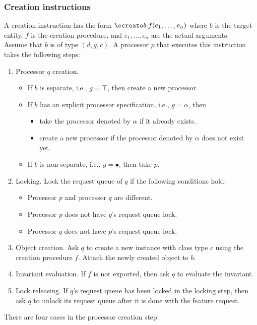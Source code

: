 \subsubsection{Creation instructions}
A creation instruction has the form $\ecreate b.f(e_{1}, \ldots, e_{n})$ where $b$ is the target entity, $f$ is the creation procedure, and $e_{1}, \ldots, e_{n}$ are the actual arguments. Assume that $b$ is of type $(d, g, c)$. A processor $p$ that executes this instruction takes the following steps:
\begin{enumerate}
	\item Processor $q$ creation.
		\begin{itemize}
			\item If $b$ is separate, i.e., $g = \top$, then create a new processor.
			\item If $b$ has an explicit processor specification, i.e., $g = \alpha$, then
				\begin{itemize}
					\item take the processor denoted by $\alpha$ if it already exists.
					\item create a new processor if the processor denoted by $\alpha$ does not exist yet.
				\end{itemize}
			\item If $b$ is non-separate, i.e., $g = \bullet$, then take $p$.
		\end{itemize}
	\item Locking. Lock the request queue of $q$ if the following conditions hold:
		\begin{itemize}
			\item Processor $p$ and processor $q$ are different.
			\item Processor $p$ does not have $q$'s request queue lock.
			\item Processor $q$ does not have $p$'s request queue lock.
		\end{itemize}
	\item Object creation. Ask $q$ to create a new instance with class type $c$ using the creation procedure $f$. Attach the newly created object to $b$.
	\item Invariant evaluation. If $f$ is not exported, then ask $q$ to evaluate the invariant.
	\item Lock releasing. If $q$'s request queue has been locked in the locking step, then ask $q$ to unlock its request queue after it is done with the feature request.
\end{enumerate}
There are four cases in the processor creation step:
